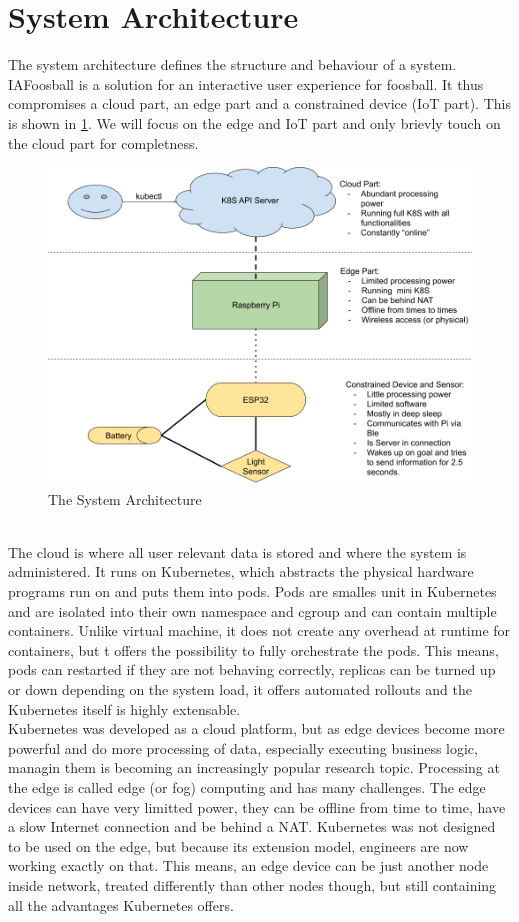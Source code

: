 \section{System Architecture}
The system architecture defines the structure and behaviour of a system. IAFoosball is a solution for an interactive user experience for foosball. It thus compromises a cloud part, an edge part and a constrained device (IoT part). This is shown in \cref{fig:systemArch}. We will focus on the edge and IoT part and only brievly touch on the cloud part for completness. 
\begin{figure}[h!]
    \centering
    \includegraphics[scale=0.3]{figures/system-arch.png}%
    \caption{The System Architecture}\label{fig:systemArch}
\end{figure}\\
The cloud is where all user relevant data is stored and where the system is administered. It runs on Kubernetes, which abstracts the physical hardware programs run on and puts them into pods. Pods are smalles unit in Kubernetes and are isolated into their own namespace and cgroup and can contain multiple containers. Unlike virtual machine, it does not create any overhead at runtime for containers, but t offers the possibility to fully orchestrate the pods. This means, pods can restarted if they are not behaving correctly, replicas can be turned up or down depending on the system load, it offers automated rollouts and the Kubernetes itself is highly extensable.\\
Kubernetes was developed as a cloud platform, but as edge devices become more powerful and do more processing of data, especially executing business logic, managin them is becoming an increasingly popular research topic. Processing at the edge is called edge (or fog) computing and has many challenges. The edge devices can have very limitted power, they can be offline from time to time, have a slow Internet connection and be behind a NAT. Kubernetes was not designed to be used on the edge, but because its extension model, engineers are now working exactly on that. This means, an edge device can be just another node inside network, treated differently than other nodes though, but still containing all the advantages Kubernetes offers.\\
